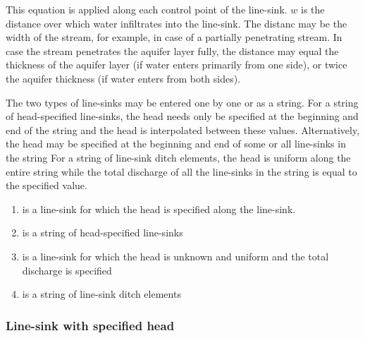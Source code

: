 \documentclass[letterpaper,10pt,english]{sphinxmanual}
\begin{document}
This equation is applied along each control point of the line-sink. \(w\) is the distance over which water infiltrates into the line-sink.
The distanc may be the width of the stream, for example, in case of a partially penetrating stream. In case the stream penetrates the aquifer
layer fully, the distance may equal the thickness of the aquifer layer (if water enters primarily from one side),
or twice the aquifer thickness (if water enters from both sides).

The two types of line-sinks may be entered one by one or as a string. For a string of head-specified line-sinks, the head needs only be specified at the beginning and
end of the string and the head is interpolated between these values. Alternatively, the head may be specified at the beginning and end of some or all line-sinks in the string
For a string of line-sink ditch elements, the head is uniform along the entire string while the total discharge of all the line-sinks in the string is equal to the specified value.
\begin{enumerate}
\item {} 
{\hyperref[\detokenize{linesinks/headlinesink:timml.linesink.HeadLineSink}]{}} is a line-sink for which the head is specified along the line-sink. 

\item {} 
{\hyperref[\detokenize{linesinks/headlinesinkstring:timml.linesink.HeadLineSinkString}]{}} is a string of head-specified line-sinks

\item {} 
{\hyperref[\detokenize{linesinks/linesinkditch:timml.linesink.LineSinkDitch}]{}} is a line-sink for which the head is unknown and uniform and the total discharge is specified

\item {} 
{\hyperref[\detokenize{linesinks/linesinkditchstring:timml.linesink.LineSinkDitchString}]{}} is a string of line-sink ditch elements

\end{enumerate}


\subsubsection{Line-sink with specified head}
\label{\detokenize{linesinks/headlinesink:line-sink-with-specified-head}}\label{\detokenize{linesinks/headlinesink::doc}}
\end{document}
